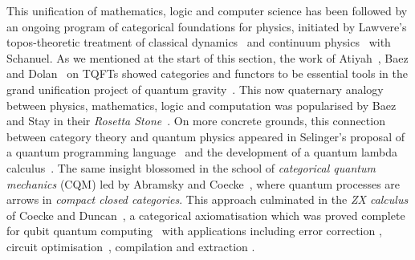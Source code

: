 This unification of mathematics, logic and computer science has been followed by an ongoing program of categorical foundations for physics, initiated by Lawvere's topos-theoretic treatment of classical dynamics~\cite{Lawvere79} and continuum physics~\cite{LawvereSchanuel86} with Schanuel.
As we mentioned at the start of this section, the work of Atiyah~\cite{Atiyah88}, Baez and Dolan~\cite{BaezDolan95} on TQFTs showed categories and functors to be essential tools in the grand unification project of quantum gravity~\cite{Baez06}.
This now quaternary analogy between physics, mathematics, logic and computation was popularised by Baez and Stay in their \emph{Rosetta Stone}~\cite{BaezStay09}.
On more concrete grounds, this connection between category theory and quantum physics appeared in Selinger's proposal of a quantum programming language~\cite{Selinger04} and the development of a quantum lambda calculus~\cite{VanTonder04,SelingerValiron06,SelingerEtAl09}.
The same insight blossomed in the school of \emph{categorical quantum mechanics} (CQM) led by Abramsky and Coecke~\cite{AbramskyCoecke04,AbramskyCoecke08}, where quantum processes are arrows in \emph{compact closed categories}.
This approach culminated in the \emph{ZX calculus} of Coecke and Duncan~\cite{CoeckeDuncan08,CoeckeDuncan11}, a categorical axiomatisation which was proved complete for qubit quantum computing~\cite{JeandelEtAl18a,HadzihasanovicEtAl18}
with applications including error correction \cite{ChancellorEtAl18,GidneyFowler19}, circuit optimisation~\cite{KissingerVanDeWetering20,DuncanEtAl20,DeBeaudrapEtAl20}, compilation \cite{CowtanEtAl20,DeGriendDuncan20} and extraction \cite{BackensEtAl20}.

